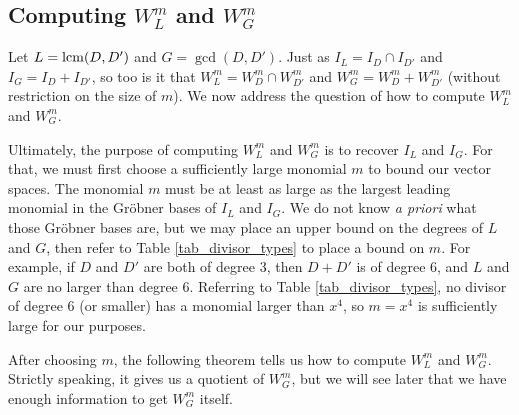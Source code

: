 
\subsection{Computing $W_L^m$ and $W_G^m$}

Let $L = \operatorname{lcm}(D, D')$ and $G = \gcd(D, D')$.
Just as $I_L = I_D \cap I_{D'}$ and $I_G = I_D + I_{D'}$,
so too is it that $W_L^m = W_D^m \cap W_{D'}^m$ and $W_G^m = W_D^m + W_{D'}^m$
(without restriction on the size of $m$).
We now address the question of how to compute $W_L^m$ and $W_G^m$.

Ultimately, the purpose of computing $W_L^m$ and $W_G^m$ is to recover $I_L$ and $I_G$.
For that, we must first choose a sufficiently large monomial $m$ to bound our vector spaces.
The monomial $m$ must be at least as large as the largest leading monomial in the Gr\"obner bases of $I_L$ and $I_G$.
We do not know \emph{a priori} what those Gr\"obner bases are,
but we may place an upper bound on the degrees of $L$ and $G$,
then refer to Table \ref{tab_divisor_types} to place a bound on $m$.
For example, if $D$ and $D'$ are both of degree 3, then $D + D'$ is of degree 6,
and $L$ and $G$ are no larger than degree 6.
Referring to Table \ref{tab_divisor_types},
no divisor of degree 6 (or smaller) has a monomial larger than $x^4$,
so $m = x^4$ is sufficiently large for our purposes.

After choosing $m$, the following theorem tells us how to compute $W_L^m$ and $W_G^m$.
Strictly speaking, it gives us a quotient of $W_G^m$,
but we will see later that we have enough information to get $W_G^m$ itself.

